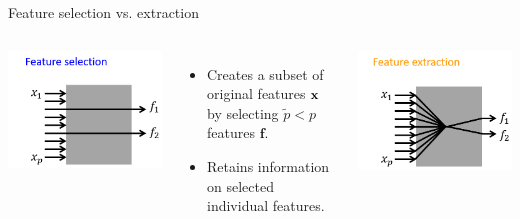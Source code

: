 \documentclass[11pt,compress,t,notes=noshow, xcolor=table]{beamer}
\begin{document}
\begin{vbframe}{Feature selection vs. extraction}

\begin{columns}


    \medskip

    \includegraphics{sl/feature-selection/figure_man/feature_selection.png}

    \smallskip

    \begin{itemize}
    \item Creates a subset of original features $\mathbf{x}$ by selecting $\tilde{p} < p$ features $\bm{f}$.
    \item Retains information on selected individual features.
    \end{itemize}


    \medskip

    \includegraphics{sl/feature-selection/figure_man/feature_extraction.png}


\end{columns}
\end{vbframe}
\end{document}
